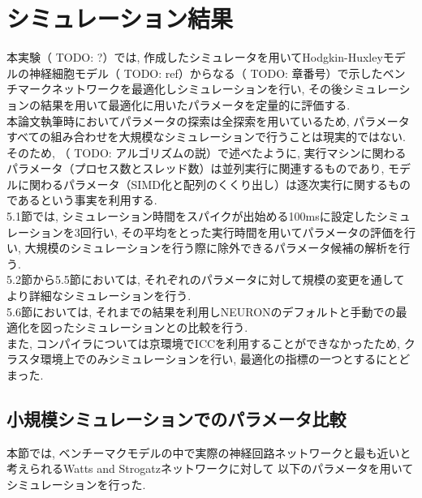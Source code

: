 \section{シミュレーション結果}
本実験（ TODO: ?）では, 作成したシミュレータを用いてHodgkin-Huxleyモデルの神経細胞モデル（ TODO: ref）からなる（ TODO: 章番号）で示したベンチマークネットワークを最適化しシミュレーションを行い,
その後シミュレーションの結果を用いて最適化に用いたパラメータを定量的に評価する.\\
本論文執筆時においてパラメータの探索は全探索を用いているため, パラメータすべての組み合わせを大規模なシミュレーションで行うことは現実的ではない.
そのため, （  TODO: アルゴリズムの説）で述べたように, 実行マシンに関わるパラメータ（プロセス数とスレッド数）は並列実行に関連するものであり,
モデルに関わるパラメータ（SIMD化と配列のくくり出し）は逐次実行に関するものであるという事実を利用する.\\
5.1節では, シミュレーション時間をスパイクが出始める100msに設定したシミュレーションを3回行い,
その平均をとった実行時間を用いてパラメータの評価を行い, 大規模のシミュレーションを行う際に除外できるパラメータ候補の解析を行う.\\
5.2節から5.5節においては, それぞれのパラメータに対して規模の変更を通してより詳細なシミュレーションを行う.\\
5.6節においては, それまでの結果を利用しNEURONのデフォルトと手動での最適化を図ったシミュレーションとの比較を行う.\\
また, コンパイラについては京環境でICCを利用することができなかったため, クラスタ環境上でのみシミュレーションを行い,
最適化の指標の一つとするにとどまった.\\

\subsection{小規模シミュレーションでのパラメータ比較}
本節では, ベンチーマクモデルの中で実際の神経回路ネットワークと最も近いと考えられるWatts and Strogatzネットワークに対して
以下のパラメータを用いてシミュレーションを行った.\\
